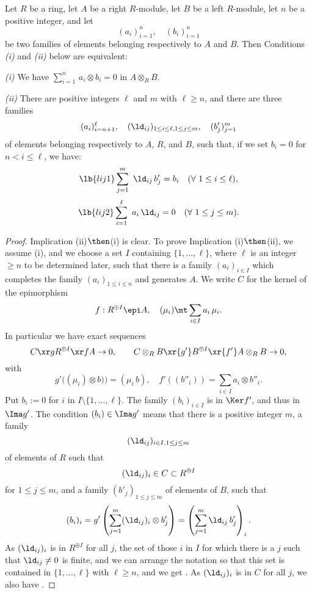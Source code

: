 \documentclass[12pt]{article}
\theoremstyle{remark}
\theoremstyle{definition}
\begin{document}
\begin{lem}
Let $R$ be a ring, let $A$ be a right $R$-module, let $B$ be a left $R$-module, let $n$ be a positive integer, and let 
$$
(a_i)_{i=1}^n,\quad(b_i)_{i=1}^n
$$
be two families of elements belonging respectively to $A$ and $B$. Then Conditions \emph{(i)} and \emph{(ii)} below are equivalent:

\nn\emph{(i)} We have $\sum_{i=1}^n\,a_i\otimes b_i=0$ in $A\otimes_RB$. 

\nn\emph{(ii)} There are positive integers $\ell$ and $m$ with $\ell\ge n$, and there are three families 
$$
(a_i)_{i=n+1}^\ell,\quad(\ld_{ij})_{1\le i\le\ell,1\le j\le m},\quad(b'_j)_{j=1}^m
$$ 
of elements belonging respectively to $A$, $R$, and $B$, such that, if we set $b_i=0$ for $n<i\le\ell$, we have:
%
\begin{equation}\lb{lij1}
\sum_{j=1}^m\ \ld_{ij}\,b'_j=b_i\quad(\forall\ 1\le i\le\ell),
\end{equation}
%
\begin{equation}\lb{lij2}
\sum_{i=1}^\ell\ a_i\,\ld_{ij}=0\quad(\forall\ 1\le j\le m).
\end{equation}
\end{lem} 

\begin{proof} 
Implication (ii)$\then$(i) is clear. To prove Implication (i)$\then$(ii), we assume (i), and we choose a set $I$ containing $\{1,\dots,\ell\}$, where $\ell$ is an integer $\ge n$ to be determined later, such that there is a family $(a_i)_{i\in I}$ which completes the family $(a_i)_{1\le i\le n}$ and generates $A$. We write $C$ for the kernel of the epimorphism 
$$
f:R^{\oplus I}\epi A,\quad(\mu_i)\mt\sum_{i\in I}a_i\,\mu_i.
$$ 
In particular we have exact sequences 
$$
C\xr gR^{\oplus I}\xr fA\to0,\qquad C\otimes_RB\xr{g'}B^{\oplus I}\xr{f'}A\otimes_RB\to0,
$$ 
with 
$$
g'\big((\mu_i)\otimes b)\big)=(\mu_i\,b),\quad f'((b''_i))=\sum_{i\in I}a_i\otimes b''_i.
$$
Put $b_i:=0$ for $i$ in $I\setminus\{1,\dots,\ell\}$. The family $(b_i)_{i\in I}$ is in $\Ker f'$, and thus in $\Ima g'$. The condition $(b_i)\in\Ima g'$ means that there is a positive integer $m$, a family 
$$
(\ld_{ij})_{i\in I,1\le j\le m}
$$ 
of elements of $R$ such that 
$$
(\ld_{ij})_i\in C\subset R^{\oplus I}
$$ 
for $1\le j\le m$, and a family $(b'_j)_{1\le j\le m}$ of elements of $B$, such that 
$$
(b_i)_i=g'
\left(\sum_{j=1}^m(\ld_{ij})_i\otimes b'_j\right)=
\left(\sum_{j=1}^m\ld_{ij}\,b'_j\right)_i.
$$ 
As $(\ld_{ij})_i$ is in $R^{\oplus I}$ for all $j$, the set of those $i$ in $I$ for which there is a $j$ such that $\ld_{ij}\neq0$ is finite, and we can arrange the notation so that this set is contained in $\{1,\dots,\ell\}$ with $\ell\ge n$, and we get . As $(\ld_{ij})_i$ is in $C$ for all $j$, we also have . 
\end{proof} 
\end{document}
